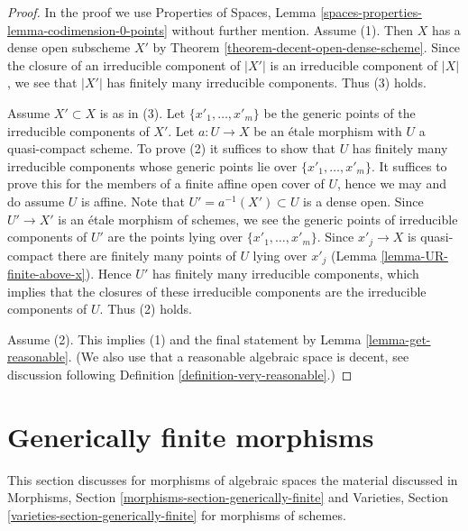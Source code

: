 \begin{proof}
In the proof we use Properties of Spaces, Lemma
\ref{spaces-properties-lemma-codimension-0-points}
without further mention.
Assume (1). Then $X$ has a dense open subscheme $X'$ by
Theorem \ref{theorem-decent-open-dense-scheme}.
Since the closure of an irreducible component of $|X'|$
is an irreducible component of $|X|$, we see that $|X'|$
has finitely many irreducible components. Thus (3) holds.

\medskip\noindent
Assume $X' \subset X$ is as in (3). Let $\{x'_1, \ldots, x'_m\}$
be the generic points of the irreducible components of $X'$.
Let $a : U \to X$ be an \'etale morphism with $U$ a quasi-compact scheme.
To prove (2) it suffices to show that $U$ has
finitely many irreducible components
whose generic points lie over $\{x'_1, \ldots, x'_m\}$. It suffices
to prove this for the members of a finite affine open cover of $U$,
hence we may and do assume $U$ is affine.
Note that $U' = a^{-1}(X') \subset U$ is a dense open.
Since $U' \to X'$ is an \'etale morphism of schemes, we see
the generic points of irreducible components of $U'$ are the points
lying over $\{x'_1, \ldots, x'_m\}$. Since $x'_j \to X$ is
quasi-compact there are finitely many points of $U$ lying over $x'_j$
(Lemma \ref{lemma-UR-finite-above-x}). Hence $U'$ has finitely
many irreducible components, which implies that the closures
of these irreducible components are the irreducible components of
$U$. Thus (2) holds.

\medskip\noindent
Assume (2). This implies (1) and the final
statement by Lemma \ref{lemma-get-reasonable}.
(We also use that a reasonable algebraic space is decent, see
discussion following Definition \ref{definition-very-reasonable}.)
\end{proof}



\section{Generically finite morphisms}
\label{section-generically-finite}

\noindent
This section discusses for morphisms of algebraic spaces the material
discussed in Morphisms, Section \ref{morphisms-section-generically-finite}
and
Varieties, Section \ref{varieties-section-generically-finite}
for morphisms of schemes.

